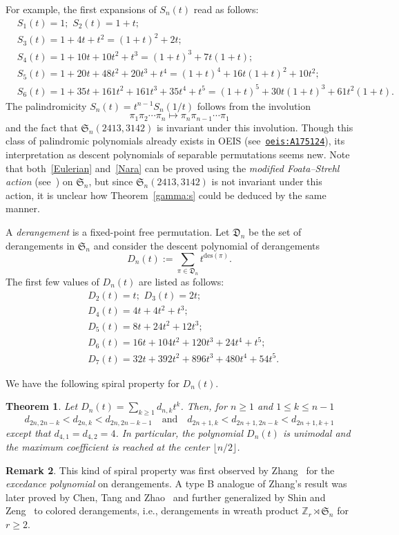 \documentclass[12pt]{amsart}
\numberwithin{equation}{section}
\theoremstyle{plain}
\newtheorem{theorem}{Theorem}[section]
\theoremstyle{definition}
\newtheorem{remark}[theorem]{Remark}
\newcommand{\Z}{\mathbb{Z}}
\def\des{\mathrm{des}}
\def\S{\mathfrak{S}}
\def\D{\mathfrak{D}}
\begin{document}
For example, the first expansions  of $S_n(t)$  read as follows:
\begin{align*}
&S_1(t)=1; \,\,S_2(t)=1+t;\\
&S_3(t)=1+4t+t^2=(1+t)^2+2t;\\
&S_4(t)=1+10t+10t^2+t^3=(1+t)^3+7t(1+t);\\
&S_5(t)=1+20t+48t^2+20t^3+t^4=(1+t)^4+16t(1+t)^2+10t^2;\\
&S_6(t)=1+35t+161t^2+161t^3+35t^4+t^5=(1+t)^5+30t(1+t)^3+61t^2(1+t).
\end{align*}
The palindromicity $S_n(t)=t^{n-1}S_n(1/t)$ follows from the involution
$$
\pi_1\pi_2\cdots\pi_n\mapsto\pi_n\pi_{n-1}\cdots\pi_1
$$
and the fact that $\S_n(2413,3142)$ is invariant under this involution. Though this class of palindromic polynomials already exists in OEIS 
(see~\href{https://oeis.org/A175124}{\tt{oeis:A175124}}), its interpretation as descent polynomials of separable permutations seems new. 
Note that  both~\eqref{Eulerian} and~\eqref{Nara} can be proved  using the {\em modified Foata--Strehl action} (see~\cite{fsh,br,linzen15}) on  $\S_n$, but since $\S_n(2413,3142)$ is not invariant under this action,  it is unclear how Theorem~\ref{gamma:s} could be deduced by the same manner. 



A {\em derangement} is a fixed-point free permutation. Let $\D_n$ be the set of derangements in $\S_n$ and 
consider   the descent polynomial of derangements 
$$
D_n(t):=\sum_{\pi\in\D_n}t^{\des(\pi)}.
$$
The first few values of $D_n(t)$ are listed as follows: 
\begin{align*}
&D_2(t)=t; \,\,D_3(t)=2t; \\
&D_4(t)=4t+4t^2+t^3;\\
&D_5(t)=8t+24t^2+12t^3;\\
&D_6(t)=16t+104t^2+120t^3+24t^4+t^5;\\
&D_7(t)=32t+392t^2+896t^3+480t^4+54t^5.
\end{align*}

We have the following spiral property for $D_n(t)$. 
 
 
 \begin{theorem}\label{thm:spiral}
 Let $D_n(t)=\sum_{k\geq1}d_{n,k}t^k$. Then, for $n\geq1$ and $1\leq k\leq n-1$
 \begin{equation}\label{spiral}
 d_{2n,2n-k}< d_{2n,k}<d_{2n,2n-k-1}\quad\text{and}\quad
 d_{2n+1,k}< d_{2n+1,2n-k}< d_{2n+1,k+1}
 \end{equation}
  except that $d_{4,1}=d_{4,2}=4$. In particular, the polynomial $D_n(t)$ is unimodal and the maximum coefficient is reached 
  at the center $\lfloor n/2\rfloor$.
 \end{theorem}
\begin{remark}
This kind of spiral property was first observed by Zhang~\cite{zh} for 
the {\em excedance polynomial} on derangements.
 A type B analogue of Zhang's result  was later proved  by Chen, Tang and Zhao~\cite{ctz}  and further generalized by Shin and Zeng~\cite[Corollary 7]{sz} to colored derangements, i.e., derangements 
 in wreath product $\Z_r\rtimes \S_n$ for $r\geq 2$.
 \end{remark}
 
\end{document}
